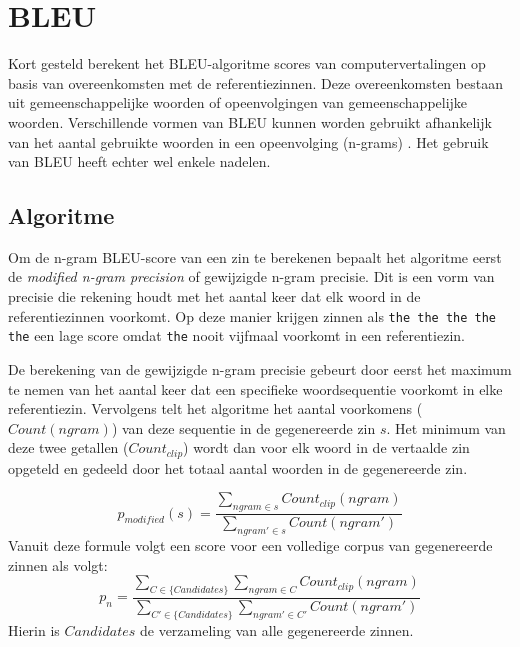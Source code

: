 \section{BLEU}
Kort gesteld berekent het BLEU-algoritme scores van computervertalingen op basis van overeenkomsten met de referentiezinnen. Deze overeenkomsten bestaan uit gemeenschappelijke woorden of opeenvolgingen van gemeenschappelijke woorden. Verschillende vormen van BLEU kunnen worden gebruikt afhankelijk van het aantal gebruikte woorden in een opeenvolging (n-grams) . Het gebruik van BLEU heeft echter wel enkele nadelen.

\subsection{Algoritme}
Om de n-gram BLEU-score van een zin te berekenen bepaalt het algoritme eerst de \textit{modified n-gram precision} of gewijzigde n-gram precisie. Dit is een vorm van precisie die rekening houdt met het aantal keer dat elk woord in de referentiezinnen voorkomt. Op deze manier krijgen zinnen als \texttt{the the the the the} een lage score omdat \texttt{the} nooit vijfmaal voorkomt in een referentiezin. 

De berekening van de gewijzigde n-gram precisie gebeurt door eerst het maximum te nemen van het aantal keer dat een specifieke woordsequentie voorkomt in elke referentiezin. Vervolgens telt het algoritme het aantal voorkomens ($Count(ngram)$) van deze sequentie in de gegenereerde zin $s$. Het minimum van deze twee getallen ($Count_ {clip}$) wordt dan voor elk woord in de vertaalde zin opgeteld en gedeeld door het totaal aantal woorden in de gegenereerde zin.

\begin{equation}
p_{modified}(s) =
\frac{\sum\limits_{ngram \in s} Count_{clip}(ngram)}{\sum\limits_{ngram' \in s} Count(ngram')}
\label{formule:ngramprecision}
\end{equation}
Vanuit deze formule volgt een score voor een volledige corpus van gegenereerde zinnen als volgt:
\begin{equation}
p_{n} =
\frac{\sum\limits_{C \in \{Candidates\} } \sum\limits_{ngram \in C} Count_{clip}(ngram)}{\sum\limits_{C' \in \{Candidates\} } \sum\limits_{ngram' \in C'} Count(ngram')}
\label{formule:corpus_modified}
\end{equation}
Hierin is $Candidates$ de verzameling van alle gegenereerde zinnen.

